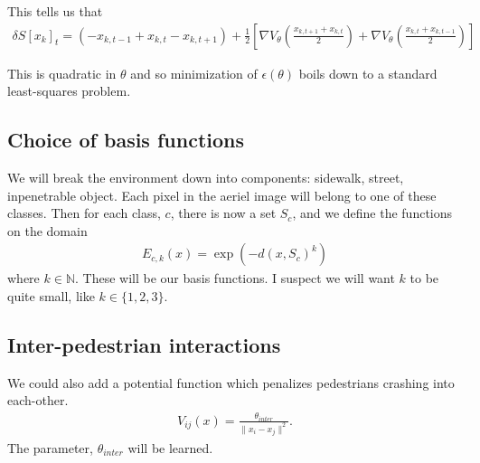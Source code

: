 \documentclass[12pt]{amsart}
\begin{document}
This tells us that
\begin{align*}
    \delta S[x_k]_t = ( - x_{k,t-1} + x_{k,t} - x_{k,t+1} ) + \frac{1}{2} \left[ \nabla V_\theta \left( \frac{x_{k,t+1} + x_{k,t} }{2} \right) + \nabla V_\theta \left( \frac{ x_{k,t} + x_{k,t-1}}{2} \right) \right]
\end{align*}

This is quadratic in $\theta$ and so minimization of $\epsilon(\theta)$ boils down to a standard least-squares problem.

\subsection{Choice of basis functions}
We will break the environment down into components: sidewalk, street, inpenetrable object.  Each pixel in the aeriel image will belong to one of these classes.  Then for each class, $c$, there is now a set $S_c$,
and we define the functions on the domain
\begin{align*}
    E_{c,k}(x) = \exp(- d( x , S_c)^k )
\end{align*}
where $k \in \mathbb{N}$.
These will be our basis functions.
I suspect we will want $k$ to be quite small, like $k \in \{1,2,3\}$.

\subsection{Inter-pedestrian interactions}
We could also add a potential function which penalizes pedestrians crashing into each-other.
\begin{align}
    V_{ij}(x) = \frac{\theta_{inter} }{ \|x_i - x_j \|^2 }.
\end{align}
The parameter, $\theta_{inter}$ will be learned.
\end{document}
